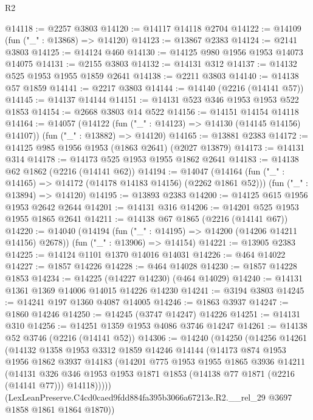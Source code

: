 \begin{lexlean}{R2}
\begin{coremodule}
@14118 := @2257 @3803
@14120 := @14117 @14118 @2704
@14122 := @14109 (fun ("_" : @13868) => @14120)
@14123 := @13867 @2383
@14124 := @2141 @3803
@14125 := @14124 @460
@14130 := @14125 @980 @1956 @1953 @14073 @14075
@14131 := @2155 @3803
@14132 := @14131 @312
@14137 := @14132 @525 @1953 @1955 @1859 @2641
@14138 := @2211 @3803
@14140 := @14138 @57 @1859
@14141 := @2217 @3803
@14144 := @14140 (@2216 (@14141 @57))
@14145 := @14137 @14144
@14151 := @14131 @523 @346 @1953 @1953 @522 @1853
@14154 := @2668 @3803 @14 @522
@14156 := @14151 @14154 @14118
@14164 := @14057
    (@14122 (fun ("_" : @14123) => @14130 (@14145 @14156) @14107))
    (fun ("_" : @13882) => @14120)
@14165 := @13881 @2383
@14172 := @14125 @985 @1956 @1953 (@1863 @2641) (@2027 @13879)
@14173 := @14131 @314
@14178 := @14173 @525 @1953 @1955 @1862 @2641
@14183 := @14138 @62 @1862 (@2216 (@14141 @62))
@14194 := @14047
    (@14164 (fun ("_" : @14165) => @14172 (@14178 @14183 @14156) (@2262 @1861 @52)))
    (fun ("_" : @13894) => @14120)
@14195 := @13893 @2383
@14200 := @14125 @615 @1956 @1953 @2642 @2644
@14201 := @14131 @316
@14206 := @14201 @525 @1953 @1955 @1865 @2641
@14211 := @14138 @67 @1865 (@2216 (@14141 @67))
@14220 := @14040
    (@14194 (fun ("_" : @14195) => @14200 (@14206 @14211 @14156) @2678))
    (fun ("_" : @13906) => @14154)
@14221 := @13905 @2383
@14225 := @14124 @1101 @1370 @14016 @14031
@14226 := @464 @14022
@14227 := @1857 @14226
@14228 := @464 @14028
@14230 := @1857 @14228 @1853
@14234 := @14225 (@14227 @14230) (@464 @14029)
@14240 := @14131 @1361 @1369 @14006 @14015 @14226 @14230
@14241 := @3194 @3803
@14245 := @14241 @197 @1360 @4087 @14005
@14246 := @1863 @3937
@14247 := @1860 @14246
@14250 := @14245 (@3747 @14247) @14226
@14251 := @14131 @310
@14256 := @14251 @1359 @1953 @4086 @3746 @14247
@14261 := @14138 @52 @3746 (@2216 (@14141 @52))
@14306 := @14240
    (@14250
      (@14256
        @14261
        (@14132
          @1358
          @1953
          @3312
          @1859
          @14246
          @14144
          (@14173
            @874
            @1953
            @1956
            @1862
            @3937
            @14183
            (@14201
              @775
              @1953
              @1955
              @1865
              @3936
              @14211
              (@14131
                @326
                @346
                @1953
                @1953
                @1871
                @1853
                (@14138 @77 @1871 (@2216 (@14141 @77)))
                @14118)))))
      (LexLeanPreserve.C4cd0caed9fdd884fa395b3066a67213e.R2.__rel_29 @3697 @1858 @1861 @1864 @1870))

\end{coremodule}
\end{lexlean}
